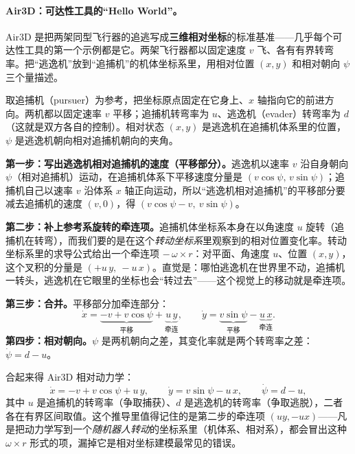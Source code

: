 \paragraph{Air3D：可达性工具的“Hello World”。}
Air3D 是把两架同型飞行器的追逃写成\textbf{三维相对坐标}的标准基准——几乎每个可达性工具的第一个示例都是它。两架飞行器都以固定速度 $v$ 飞、各有有界转弯率。把“逃逸机”放到“追捕机”的机体坐标系里，用相对位置 $(x,y)$ 和相对朝向 $\psi$ 三个量描述。

\begin{derivation}
\label{deriv:dg-air3d}
取追捕机（pursuer）为参考，把坐标原点固定在它身上、$x$ 轴指向它的前进方向。两机都以固定速率 $v$ 平移；追捕机转弯率为 $u$、逃逸机（evader）转弯率为 $d$（这就是双方各自的控制）。相对状态 $(x,y)$ 是逃逸机在追捕机体系里的位置，$\psi$ 是逃逸机朝向相对追捕机朝向的夹角。

\textbf{第一步：写出逃逸机相对追捕机的速度（平移部分）。}\;逃逸机以速率 $v$ 沿自身朝向 $\psi$（相对追捕机）运动，在追捕机体系下平移速度分量是 $(v\cos\psi,\,v\sin\psi)$；追捕机自己以速率 $v$ 沿体系 $x$ 轴正向运动，所以“逃逸机相对追捕机”的平移部分要减去追捕机的速度 $(v,0)$，得 $(v\cos\psi-v,\ v\sin\psi)$。

\textbf{第二步：补上参考系旋转的牵连项。}\;追捕机体坐标系本身在以角速度 $u$ 旋转（追捕机在转弯），而我们要的是在这个\emph{转动坐标系}里观察到的相对位置变化率。转动坐标系里的求导公式给出一个牵连项 $-\,\omega\times r$：对平面、角速度 $u$、位置 $(x,y)$，这个叉积的分量是 $(+u\,y,\ -u\,x)$。直觉是：哪怕逃逸机在世界里不动，追捕机一转头，逃逸机在它眼里的坐标也会“转过去”——这个视觉上的移动就是牵连项。

\textbf{第三步：合并。}\;平移部分加牵连部分：
\[
  \dot x=\underbrace{-v+v\cos\psi}_{\text{平移}}+\underbrace{u\,y}_{\text{牵连}},\qquad \dot y=\underbrace{v\sin\psi}_{\text{平移}}-\underbrace{u\,x}_{\text{牵连}}.
\]
\textbf{第四步：相对朝向。}\;$\psi$ 是两机朝向之差，其变化率就是两个转弯率之差：$\dot\psi=d-u$。
\end{derivation}

合起来得 Air3D 相对动力学：
\begin{equation}
  \dot x=-v+v\cos\psi+u\,y,\qquad \dot y=v\sin\psi-u\,x,\qquad \dot\psi=d-u,
  \label{eq:dg-air3d}
\end{equation}
其中 $u$ 是追捕机的转弯率（争取捕获）、$d$ 是逃逸机的转弯率（争取逃脱），二者各在有界区间取值。这个推导里值得记住的是第二步的牵连项 $(uy,-ux)$——凡是把动力学写到一个\emph{随机器人转动}的坐标系里（机体系、相对系），都会冒出这种 $\omega\times r$ 形式的项，漏掉它是相对坐标建模最常见的错误。

